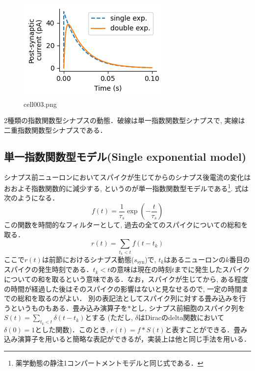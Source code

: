 \begin{figure}[ht]
	\centering
	\includegraphics[scale=0.8, max width=\linewidth]{./fig/synapse-model/expo-synapse/cell003.png}
	\caption{cell003.png}
	\label{cell003.png}
\end{figure}
2種類の指数関数型シナプスの動態．破線は単一指数関数型シナプスで, 実線は二重指数関数型シナプスである．
\subsection{単一指数関数型モデル(Single exponential model)}
シナプス前ニューロンにおいてスパイクが生じてからのシナプス後電流の変化はおおよそ指数関数的に減少する, というのが単一指数関数型モデルである\footnote{薬学動態の静注1コンパートメントモデルと同じ式である．}. 式は次のようになる．
\begin{equation}
f(t)=\frac{1}{\tau_{s}}\exp\left(-\frac{t}{\tau_s}\right)    
\end{equation}
この関数を時間的なフィルターとして, 過去の全てのスパイクについての総和を取る．
\begin{equation}
r(t)=\sum_{t_{k}< t} f\left(t-t_{k}\right)
\end{equation}
ここで${r(t)}$は前節におけるシナプス動態($s_{\text{syn}}$)で, $t_{k}$はあるニューロンの$k$番目のスパイクの発生時刻である．${t_{k}<t}$の意味は現在の時刻$t$までに発生したスパイクについての和を取るという意味である．なお，スパイクが生じてから, ある程度の時間が経過した後はそのスパイクの影響はないと見なせるので, 一定の時間までの総和を取るのがよい．
別の表記法としてスパイク列に対する畳み込みを行うというものもある．畳み込み演算子を$*$とし, シナプス前細胞のスパイク列を$S(t)=\sum_{t_{k}< t} \delta\left(t-t_{k}\right)$とする (ただし, $\delta$はDiracのdelta関数において$\delta(0)=1$とした関数)．このとき, $r(t)=f*S(t)$と表すことができる．畳み込み演算子を用いると簡略な表記ができるが，実装上は他と同じ手法を用いる．
